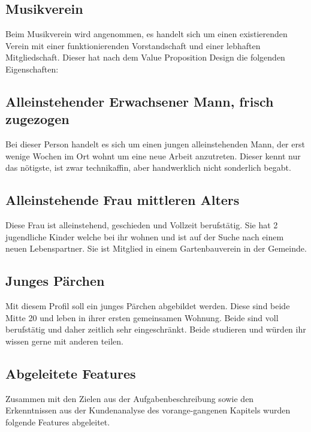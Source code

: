\subsection*{Musikverein}
Beim Musikverein wird angenommen, es handelt sich um einen existierenden Verein mit einer funktionierenden Vorstandschaft und einer lebhaften Mitgliedschaft.
Dieser hat nach dem Value Proposition Design die folgenden Eigenschaften:


\subsection*{Alleinstehender Erwachsener Mann, frisch zugezogen}
Bei dieser Person handelt es sich um einen jungen alleinstehenden Mann, der erst wenige Wochen im Ort wohnt um eine neue Arbeit anzutreten. Dieser kennt nur das nötigste, ist zwar technikaffin, aber handwerklich nicht sonderlich begabt.

\subsection*{Alleinstehende Frau mittleren Alters}
Diese Frau ist alleinstehend, geschieden und Vollzeit berufstätig. Sie hat 2 jugendliche Kinder welche bei ihr wohnen und ist auf der Suche nach einem neuen Lebenspartner. Sie ist Mitglied in einem Gartenbauverein in der Gemeinde.

\subsection*{Junges Pärchen}
Mit diesem Profil soll ein junges Pärchen abgebildet werden. Diese sind beide Mitte 20 und leben in ihrer ersten gemeinsamen Wohnung. Beide sind voll berufstätig und daher zeitlich sehr eingeschränkt. Beide studieren und würden ihr wissen gerne mit anderen teilen.

\subsection{Abgeleitete Features}
Zusammen mit den Zielen aus der Aufgabenbeschreibung sowie den Erkenntnissen aus der Kundenanalyse des vorange-gangenen Kapitels wurden folgende Features abgeleitet.

